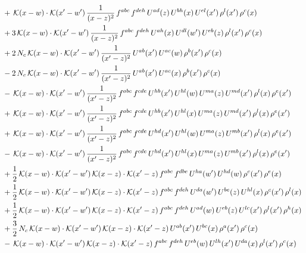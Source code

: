 \documentclass[9pt]{article}
\numberwithin{equation}{section}
\begin{document}
\begin{align}
&+\,\mathcal{K}(x-w)\cdot\mathcal{K}(x'-w')\,\frac{1}{(x-z)^{2}}\,f^{abc}\,f^{deh}\,U^{ad}(z)\,U^{bh}(x)\,U^{el}(x')\,\rho^{l}(x')\,\rho^{c}(x)\notag\\
&+3\,\mathcal{K}(x-w)\cdot\mathcal{K}(x'-w')\,\frac{1}{(x-z)^{2}}\,f^{abc}\,f^{deh}\,U^{ah}(x)\,U^{dl}(w')\,U^{eb}(z)\,\rho^{l}(x')\,\rho^{c}(x)\notag\\
&+2\,N_{c}\,\mathcal{K}(x-w)\cdot\mathcal{K}(x'-w')\,\frac{1}{(x'-z)^{2}}\,U^{ab}(x')\,U^{ac}(w)\,\rho^{b}(x')\,\rho^{c}(x)\notag\\
&-2\,N_{c}\,\mathcal{K}(x-w)\cdot\mathcal{K}(x'-w')\,\frac{1}{(x'-z)^{2}}\,U^{ab}(x')\,U^{ac}(x)\,\rho^{b}(x')\,\rho^{c}(x)\notag\\
&-\,\mathcal{K}(x-w)\cdot\mathcal{K}(x'-w')\,\frac{1}{(x'-z)^{2}}\,f^{abc}\,f^{cde}\,U^{hb}(x')\,U^{hl}(w)\,U^{ma}(z)\,U^{md}(x')\,\rho^{l}(x)\,\rho^{e}(x')\notag\\
&+\,\mathcal{K}(x-w)\cdot\mathcal{K}(x'-w')\,\frac{1}{(x'-z)^{2}}\,f^{abc}\,f^{cde}\,U^{hb}(x')\,U^{hl}(x)\,U^{ma}(z)\,U^{md}(x')\,\rho^{l}(x)\,\rho^{e}(x')\notag\\
&+\,\mathcal{K}(x-w)\cdot\mathcal{K}(x'-w')\,\frac{1}{(x'-z)^{2}}\,f^{abc}\,f^{cde}\,U^{hd}(x')\,U^{hl}(w)\,U^{ma}(z)\,U^{mb}(x')\,\rho^{l}(x)\,\rho^{e}(x')\notag\\
&-\,\mathcal{K}(x-w)\cdot\mathcal{K}(x'-w')\,\frac{1}{(x'-z)^{2}}\,f^{abc}\,f^{cde}\,U^{hd}(x')\,U^{hl}(x)\,U^{ma}(z)\,U^{mb}(x')\,\rho^{l}(x)\,\rho^{e}(x')\notag\\
&+\frac{1}{2}\,\mathcal{K}(x-w)\cdot\mathcal{K}(x'-w')\,\mathcal{K}(x-z)\cdot\mathcal{K}(x'-z)\,f^{abc}\,f^{dbe}\,U^{ha}(w')\,U^{hd}(w)\,\rho^{c}(x')\,\rho^{e}(x)\notag\\
&+\frac{1}{2}\,\mathcal{K}(x-w)\cdot\mathcal{K}(x'-w')\,\mathcal{K}(x-z)\cdot\mathcal{K}(x'-z)\,f^{abc}\,f^{deh}\,U^{da}(w')\,U^{be}(z)\,U^{hl}(x)\,\rho^{c}(x')\,\rho^{l}(x)\notag\\
&+\frac{1}{2}\,\mathcal{K}(x-w)\cdot\mathcal{K}(x'-w')\,\mathcal{K}(x-z)\cdot\mathcal{K}(x'-z)\,f^{abc}\,f^{deh}\,U^{ad}(w)\,U^{eb}(z)\,U^{lc}(x')\,\rho^{l}(x')\,\rho^{h}(x)\notag\\
&+\frac{3}{2}\,N_{c}\,\mathcal{K}(x-w)\cdot\mathcal{K}(x'-w')\,\mathcal{K}(x-z)\cdot\mathcal{K}(x'-z)\,U^{ab}(x')\,U^{bc}(x)\,\rho^{a}(x')\,\rho^{c}(x)\notag\\
&-\,\mathcal{K}(x-w)\cdot\mathcal{K}(x'-w')\,\mathcal{K}(x-z)\cdot\mathcal{K}(x'-z)\,f^{abc}\,f^{deh}\,U^{eb}(w)\,U^{lh}(x')\,U^{da}(x)\,\rho^{l}(x')\,\rho^{c}(x)\notag\\

\end{align}
\end{document}
